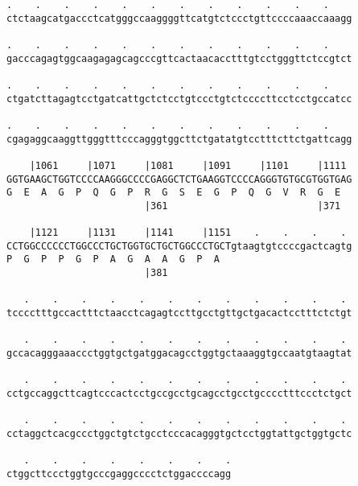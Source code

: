 \documentclass{article}
\begin{document}
\begin{Verbatim}
.    .    .    .    .    .    .    .    .    .    .    .    
ctctaagcatgaccctcatgggccaaggggttcatgtctccctgttccccaaaccaaagg
                                                            
.    .    .    .    .    .    .    .    .    .    .    .    
gacccagagtggcaagagagcagcccgttcactaacacctttgtcctgggttctccgtct
                                                            
.    .    .    .    .    .    .    .    .    .    .    .    
ctgatcttagagtcctgatcattgctctcctgtccctgtctccccttcctcctgccatcc
                                                            
.    .    .    .    .    .    .    .    .    .    .    .    
cgagaggcaaggttgggtttcccagggtggcttctgatatgtcctttcttctgattcagg
                                                            
    |1061     |1071     |1081     |1091     |1101     |1111 
GGTGAAGCTGGTCCCCAAGGGCCCCGAGGCTCTGAAGGTCCCCAGGGTGTGCGTGGTGAG
G  E  A  G  P  Q  G  P  R  G  S  E  G  P  Q  G  V  R  G  E  
                        |361                          |371  
  
    |1121     |1131     |1141     |1151    .    .    .    . 
CCTGGCCCCCCTGGCCCTGCTGGTGCTGCTGGCCCTGCTgtaagtgtccccgactcagtg
P  G  P  P  G  P  A  G  A  A  G  P  A                       
                        |381                                
  
   .    .    .    .    .    .    .    .    .    .    .    . 
tcccctttgccactttctaacctcagagtccttgcctgttgctgacactcctttctctgt
                                                            
   .    .    .    .    .    .    .    .    .    .    .    . 
gccacagggaaaccctggtgctgatggacagcctggtgctaaaggtgccaatgtaagtat
                                                            
   .    .    .    .    .    .    .    .    .    .    .    . 
cctgccaggcttcagtcccactcctgccgcctgcagcctgcctgcccctttccctctgct
                                                            
   .    .    .    .    .    .    .    .    .    .    .    . 
cctaggctcacgccctggctgtctgcctcccacagggtgctcctggtattgctggtgctc
                                                            
   .    .    .    .    .    .    .    .
ctggcttccctggtgcccgaggcccctctggaccccagg
                                       
                                       
 

\end{Verbatim}
\end{document}
